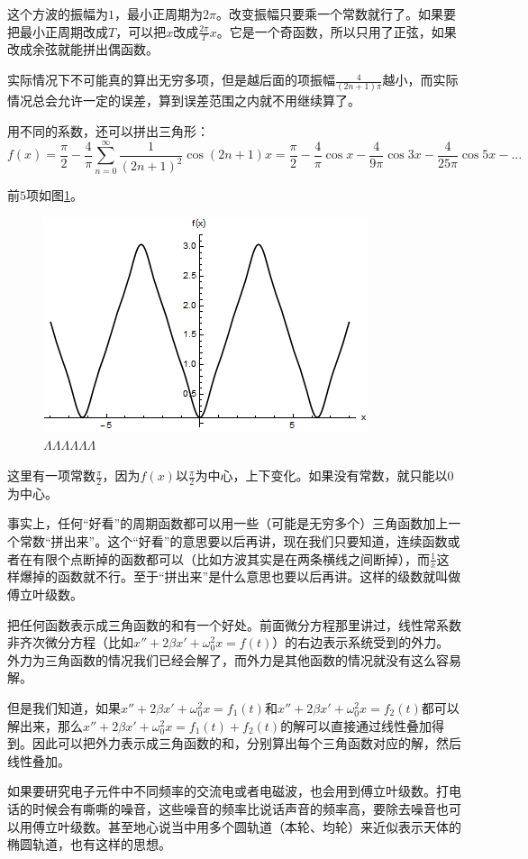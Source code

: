 这个方波的振幅为$1$，最小正周期为$2 \pi$。改变振幅只要乘一个常数就行了。如果要把最小正周期改成$T$，可以把$x$改成$\frac{2 \pi}{T} x$。它是一个奇函数，所以只用了正弦，如果改成余弦就能拼出偶函数。

实际情况下不可能真的算出无穷多项，但是越后面的项振幅$\frac{4}{(2 n+1) \pi}$越小，而实际情况总会允许一定的误差，算到误差范围之内就不用继续算了。

用不同的系数，还可以拼出三角形：
\begin{equation*}
f(x)=\frac{\pi}{2}-\frac{4}{\pi} \sum_{n=0}^{\infty} \frac{1}{(2 n+1)^2} \cos (2 n+1) x=\frac{\pi}{2}-\frac{4}{\pi} \cos x-\frac{4}{9 \pi} \cos 3 x-\frac{4}{25 \pi} \cos 5 x-\dots
\end{equation*}

前$5$项如图\ref{fig-trigo-triangle-wave}。
\begin{figure}[htb]
\centering
\includegraphics[width=0.33\linewidth]{fig/trigo-triangle-wave.png}
\caption{$\Lambda\Lambda\Lambda\Lambda\Lambda\Lambda$}
\label{fig-trigo-triangle-wave}
\end{figure}

这里有一项常数$\frac{\pi}{2}$，因为$f(x)$以$\frac{\pi}{2}$为中心，上下变化。如果没有常数，就只能以$0$为中心。

事实上，任何“好看”的周期函数都可以用一些（可能是无穷多个）三角函数加上一个常数“拼出来”。这个“好看”的意思要以后再讲，现在我们只要知道，连续函数或者在有限个点断掉的函数都可以（比如方波其实是在两条横线之间断掉），而$\frac{1}{x}$这样爆掉的函数就不行。至于“拼出来”是什么意思也要以后再讲。这样的级数就叫做傅立叶级数。

把任何函数表示成三角函数的和有一个好处。前面微分方程那里讲过，线性常系数非齐次微分方程（比如$x''+2 \beta x'+\omega_0^2 x=f(t)$）的右边表示系统受到的外力。外力为三角函数的情况我们已经会解了，而外力是其他函数的情况就没有这么容易解。

但是我们知道，如果$x''+2 \beta x'+\omega_0^2 x=f_1(t)$和$x''+2 \beta x'+\omega_0^2 x=f_2(t)$都可以解出来，那么$x''+2 \beta x'+\omega_0^2 x=f_1(t)+f_2(t)$的解可以直接通过线性叠加得到。因此可以把外力表示成三角函数的和，分别算出每个三角函数对应的解，然后线性叠加。

如果要研究电子元件中不同频率的交流电或者电磁波，也会用到傅立叶级数。打电话的时候会有嘶嘶的噪音，这些噪音的频率比说话声音的频率高，要除去噪音也可以用傅立叶级数。甚至地心说当中用多个圆轨道（本轮、均轮）来近似表示天体的椭圆轨道，也有这样的思想。
